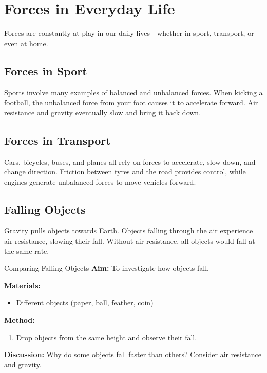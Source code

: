 \section{Forces in Everyday Life}

Forces are constantly at play in our daily lives—whether in sport, transport, or even at home.

\subsection{Forces in Sport}

Sports involve many examples of balanced and unbalanced forces. When kicking a football, the unbalanced force from your foot causes it to accelerate forward. Air resistance and gravity eventually slow and bring it back down.

\subsection{Forces in Transport}

Cars, bicycles, buses, and planes all rely on forces to accelerate, slow down, and change direction. Friction between tyres and the road provides control, while engines generate unbalanced forces to move vehicles forward.

\subsection{Falling Objects}

Gravity pulls objects towards Earth. Objects falling through the air experience air resistance, slowing their fall. Without air resistance, all objects would fall at the same rate.

\begin{investigation}{Comparing Falling Objects}
\textbf{Aim:} To investigate how objects fall.

\textbf{Materials:}
\begin{itemize}
    \item Different objects (paper, ball, feather, coin)
\end{itemize}

\textbf{Method:}
\begin{enumerate}
    \item Drop objects from the same height and observe their fall.
\end{enumerate}

\textbf{Discussion:} Why do some objects fall faster than others? Consider air resistance and gravity.
\end{investigation}

